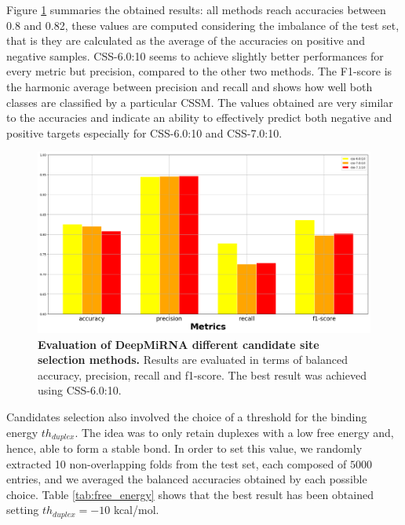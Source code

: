 Figure \ref{fig:cssm} summaries the obtained results: all methods reach accuracies between 0.8 and 0.82, these values are computed considering the imbalance of the test set, that is they are calculated as the average of the accuracies on positive and negative samples. CSS-6.0:10 seems to achieve slightly better performances for every metric but precision, compared to the other two methods. The F1-score is the harmonic average between precision and recall and shows how well both classes are classified by a particular CSSM. The values obtained are very similar to the accuracies and indicate an ability to effectively predict both negative and positive targets especially for CSS-6.0:10 and CSS-7.0:10.

\begin{figure}[hbt!]
	\centering
	\includegraphics[width=\textwidth]{Figures/cssm_evaluation}
	\caption{\textbf{Evaluation of DeepMiRNA different candidate site selection methods.} Results are evaluated in terms of balanced accuracy, precision, recall and f1-score. The best result was achieved using CSS-6.0:10.}
	\label{fig:cssm}
\end{figure}

Candidates selection also involved the choice of a threshold for the binding energy $th_{duplex}$.  The idea was to only retain duplexes with a low free energy and, hence, able to form a stable bond. In order to set this value, we randomly extracted 10 non-overlapping folds from the test set, each composed of $5000$ entries, and we averaged the balanced accuracies obtained by each possible choice. Table \ref{tab:free_energy} shows that the best result has been obtained setting $th_{duplex} = -10$ kcal/mol. 

